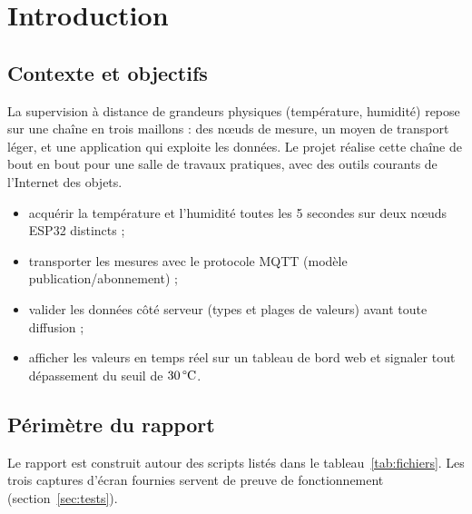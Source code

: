 \documentclass[11pt,a4paper]{article}
\DeclareRobustCommand{\degC}{\mbox{\,\textdegree C}\xspace}
\begin{document}
\section{Introduction}

\subsection{Contexte et objectifs}

La supervision à distance de grandeurs physiques (température, humidité) repose sur une
chaîne en trois maillons : des nœuds de mesure, un moyen de transport léger, et une application
qui exploite les données. Le projet réalise cette chaîne de bout en bout pour une salle de travaux
pratiques, avec des outils courants de l'Internet des objets.

\begin{tcolorbox}[colback=teal!5,colframe=teal,coltitle=white,
  title={\bfseries Objectifs du projet},arc=3pt,boxrule=0.8pt,
  left=7pt,right=7pt,top=5pt,bottom=5pt]
\begin{itemize}
  \item acquérir la température et l'humidité toutes les 5 secondes sur deux nœuds ESP32 distincts ;
  \item transporter les mesures avec le protocole MQTT (modèle publication/abonnement) ;
  \item valider les données côté serveur (types et plages de valeurs) avant toute diffusion ;
  \item afficher les valeurs en temps réel sur un tableau de bord web et signaler tout dépassement du seuil de $30\degC$.
\end{itemize}
\end{tcolorbox}

\subsection{Périmètre du rapport}

Le rapport est construit autour des scripts listés dans le tableau~\ref{tab:fichiers}. Les trois captures d'écran fournies servent de preuve de fonctionnement (section~\ref{sec:tests}).
\end{document}
